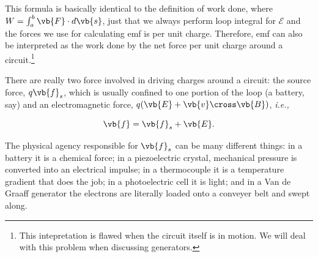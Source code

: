\documentclass[english,a4paper,12pt]{report}
\begin{document}
\begin{center}
\end{center}

This formula is basically identical to the definition of work done, where \(W = \int_{a}^{b} \vb{F} \cdot d \vb{s}  \), just that we always perform loop integral for \(\mathcal{E}\) and the forces we use for calculating emf is per unit charge. Therefore, emf can also be interpreted as the work done by the net force per unit charge around a circuit.\footnote{This intepretation is flawed when the circuit itself is in motion. We will deal with this problem when discussing generators.}

There are really two force involved in driving charges around a circuit: the source force, \(q \vb{f} _{s}  \), which is usually confined to one portion of the loop (a battery, say) and an electromagnetic force, \(q(\vb{E} + \vb{v} \cross \vb{B} ) \), \textit{i.e.,} 

\begin{equation}
    \vb{f} = \vb{f} _{s} + \vb{E} . 
\end{equation}

The physical agency responsible for \(\vb{f} _{s} \)  can be many different things: in a battery it is a chemical force; in a piezoelectric crystal, mechanical pressure is converted into an electrical impulse; in a thermocouple it is a temperature gradient that does the job; in a photoelectric cell it is light; and in a Van de Graaff generator the electrons are literally loaded onto a conveyer belt and swept along. 
\end{document}
